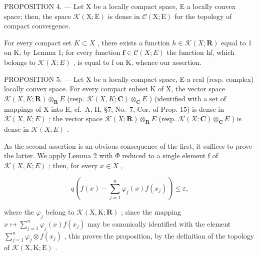 PROPOSITION 4. --- Let X be a locally compact space, E a locally convex space; then, the space \(\mathcal{K}(\mathrm{X};\mathrm{E})\) is dense in \(\mathcal{C}(\mathrm{X};\mathrm{E})\) for the topology of compact convergence.

For every compact set \(K \subset X\) , there exists a function \(h \in \mathcal{K}(X; \mathbf{R})\) equal to 1 on K, by Lemma 1; for every function \(\mathbf{f} \in \mathcal{C}(X; E)\) the function hf, which belongs to \(\mathcal{K}(X; E)\) , is equal to f on K, whence our assertion.

PROPOSITION 5. --- Let X be a locally compact space, E a real (resp. complex) locally convex space. For every compact subset K of X, the vector space \(\mathcal{K}(X,K;\mathbf{R})\otimes_{\mathbf{R}}E\) (resp. \(\mathcal{K}(X,K;\mathbf{C})\otimes_{\mathbf{C}}E\) ) (identified with a set of mappings of X into E, cf.~A, II, §7, No.~7, Cor. of Prop. 15) is dense in \(\mathcal{K}(X,K;E)\) ; the vector space \(\mathcal{K}(X;\mathbf{R})\otimes_{\mathbf{R}}E\) (resp. \(\mathcal{K}(X;\mathbf{C})\otimes_{\mathbf{C}}E\) ) is dense in \(\mathcal{K}(X;E)\) .

As the second assertion is an obvious consequence of the first, it suffices to prove the latter. We apply Lemma 2 with \(\Phi\) reduced to a single element f of \(\mathcal{K}(X,K;E)\) ; then, for every \(x\in X\) ,

\[
q \left(f (x) - \sum_ {j = 1} ^ {n} \varphi_ {j} (x) f \left(x _ {j}\right)\right) \leqslant \varepsilon ,
\]

where the \(\varphi_{j}\) belong to \(\mathcal{K}(\mathrm{X},\mathrm{K};\mathbf{R})\) ; since the mapping \(x\mapsto \sum_{j = 1}^{n}\varphi_{j}(x)f(x_{j})\) may be canonically identified with the element \(\sum_{j = 1}^{n}\varphi_{j}\otimes f(x_{j})\) , this proves the proposition, by the definition of the topology of \(\mathcal{K}(\mathrm{X},\mathrm{K};\mathrm{E})\) .

